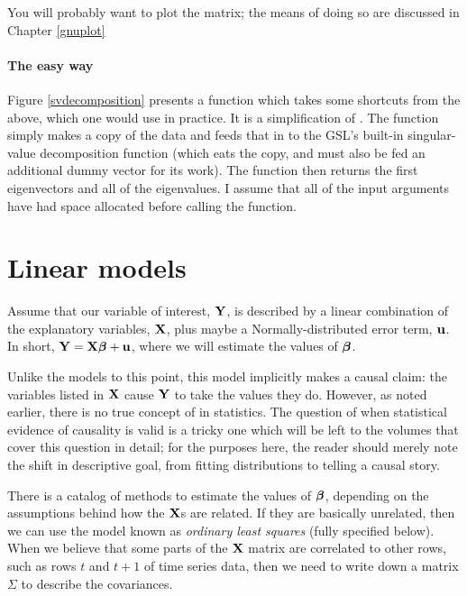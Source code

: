 You will probably want to plot the  matrix; the means
of doing so are discussed in Chapter \ref{gnuplot}

\paragraph{The easy way}

Figure \ref{svdecomposition} presents a function which takes some
shortcuts from the above, which one would use in practice. It is a
simplification of . The function simply makes
a copy of the data and feeds that in to the GSL's built-in singular-value
decomposition function (which eats the copy, and must also be fed an
additional dummy vector for its work). The function then returns the first
 eigenvectors and all of the eigenvalues. I
assume that all of the input arguments have had space allocated before
calling the function.  




\section{Linear models}
\label{cat}

Assume that our variable of interest, ${\bf Y}$, is
described by a linear combination of the explanatory variables, ${\bf X}$,
plus maybe a Normally-distributed error term, ${\bf u}$. In short,
${\bf Y}={\bf X}{\mbox{\boldmath$\beta$}} + {\bf u}$, where we will estimate the values of ${\mbox{\boldmath$\beta$}}$. 

Unlike the models to this point, this model implicitly makes a
causal claim: the variables listed in ${\bf X}$ cause ${\bf Y}$ to take the values they
do. However, as
noted earlier, there is no true concept of  in statistics.
The question of when statistical evidence of causality is valid is a tricky
one which will be left to the volumes that cover this question in
detail; for the purposes here, the reader should merely note the shift in
descriptive goal, from fitting distributions to telling a causal story.

There is a catalog of methods to estimate the values of ${\mbox{\boldmath$\beta$}}$,
depending on the assumptions behind how the ${\bf X}$s are related. If they
are basically unrelated, then we can use the model known as {\em ordinary
least squares} (fully specified below). When we believe that some parts
of the ${\bf X}$ matrix are correlated to other rows, such as rows $t$ and
$t+1$ of 
time series data, then we need to write down a matrix
$\Sigma$ to describe the covariances.

